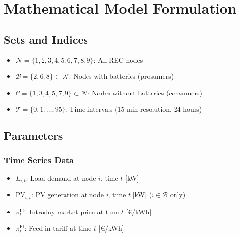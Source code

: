 \documentclass[11pt,a4paper]{article}
\begin{document}
\section{Mathematical Model Formulation}

\subsection{Sets and Indices}

\begin{itemize}
    \item $\mathcal{N} = \{1, 2, 3, 4, 5, 6, 7, 8, 9\}$: All REC nodes
    \item $\mathcal{B} = \{2, 6, 8\} \subset \mathcal{N}$: Nodes with batteries (prosumers)
    \item $\mathcal{C} = \{1, 3, 4, 5, 7, 9\} \subset \mathcal{N}$: Nodes without batteries (consumers)
    \item $\mathcal{T} = \{0, 1, \ldots, 95\}$: Time intervals (15-min resolution, 24 hours)
\end{itemize}

\subsection{Parameters}

\subsubsection*{Time Series Data}
\begin{itemize}
    \item $L_{i,t}$: Load demand at node $i$, time $t$ [kW]
    \item $\text{PV}_{i,t}$: PV generation at node $i$, time $t$ [kW] ($i \in \mathcal{B}$ only)
    \item $\pi_t^{\text{ID}}$: Intraday market price at time $t$ [€/kWh]
    \item $\pi_t^{\text{FI}}$: Feed-in tariff at time $t$ [€/kWh]
\end{itemize}
\end{document}
